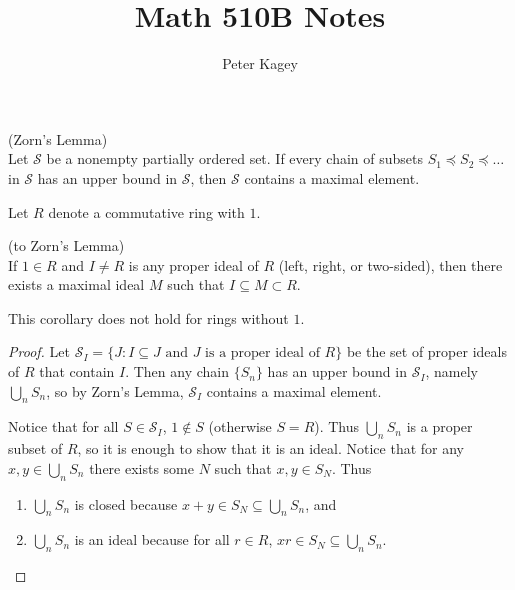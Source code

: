 \documentclass{article}
\newenvironment{definition}[1][Definition.]{
  \begin{trivlist} \item[\hskip \labelsep {\bfseries #1}]
}{\end{trivlist}}
\newenvironment{note}[1][Note.]{
  \begin{trivlist} \item[\hskip \labelsep {\bfseries #1}]
}{\end{trivlist}}
\newenvironment{theorem}[1][Theorem.]{
  \begin{trivlist} \item[\hskip \labelsep {\bfseries #1}]
}{\end{trivlist}}
\newcommand{\set}[1]{\{ #1 \}}
\begin{document}
\title{Math 510B Notes}
\author{Peter Kagey}

\maketitle

\begin{theorem}[Lemma.] (Zorn's Lemma) \\
  Let $\mathscr S$ be a nonempty partially ordered set. If every chain of
  subsets $S_1 \preceq S_2 \preceq \hdots$ in $\mathscr S$ has an upper bound in
  $\mathscr S$, then $\mathscr S$ contains a maximal element.
\end{theorem}

\begin{definition}[Notation.]
  Let $R$ denote a commutative ring with $1$.
\end{definition}

\begin{theorem}[Corollary.] (to Zorn's Lemma) \\
  If $1 \in R$ and $I \neq R$ is any proper ideal of $R$
  (left, right, or two-sided), then there exists a maximal ideal $M$ such that
  $I \subseteq M \subset R$.
\end{theorem}
\begin{note}
  This corollary does not hold for rings without $1$.
\end{note}
\begin{proof}
  Let $\mathscr S_I = \set{J : I \subseteq J \text{ and } J \text{ is a proper ideal of } R}$
  be the set of proper ideals of $R$ that contain $I$. Then any chain
  $\set{S_n}$ has an upper bound in $\mathscr S_I$, namely $\bigcup_n S_n$, so
  by Zorn's Lemma, $\mathscr S_I$ contains a maximal element.

  Notice that for all $S \in \mathscr S_I$, $1 \not\in S$ (otherwise $S = R$).
  Thus $\bigcup_n S_n$ is a proper subset of $R$, so it is enough to show that
  it is an ideal. Notice that for any $x, y \in \bigcup_n S_n$ there exists some
  $N$ such that $x, y \in S_N$. Thus
  \begin{enumerate}
    \item $\bigcup_n S_n$ is closed because
    $x + y \in S_N \subseteq \bigcup_n S_n$, and
    \item $\bigcup_n S_n$ is an ideal because for all $r \in R$,
    $xr \in S_N \subseteq \bigcup_n S_n$.
  \end{enumerate}
\end{proof}
\end{document}
